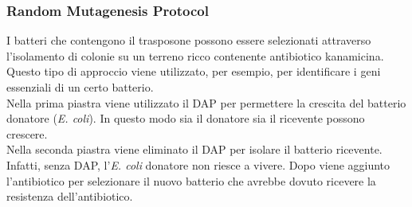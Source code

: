 \subsubsection{Random Mutagenesis Protocol}
I batteri che contengono il trasposone possono essere selezionati attraverso l'isolamento di colonie su un terreno ricco contenente antibiotico kanamicina. Questo tipo di approccio viene utilizzato, per esempio, per identificare i geni essenziali di un certo batterio. 
\\Nella prima piastra viene utilizzato il DAP per permettere la crescita del batterio donatore (\textit{E. coli}). In questo modo sia il donatore sia il ricevente possono crescere. 
\\Nella seconda piastra viene eliminato il DAP per isolare il batterio ricevente. Infatti, senza DAP, l'\textit{E. coli} donatore non riesce a vivere. Dopo viene aggiunto l'antibiotico per selezionare il nuovo batterio che avrebbe dovuto ricevere la resistenza dell'antibiotico.  
